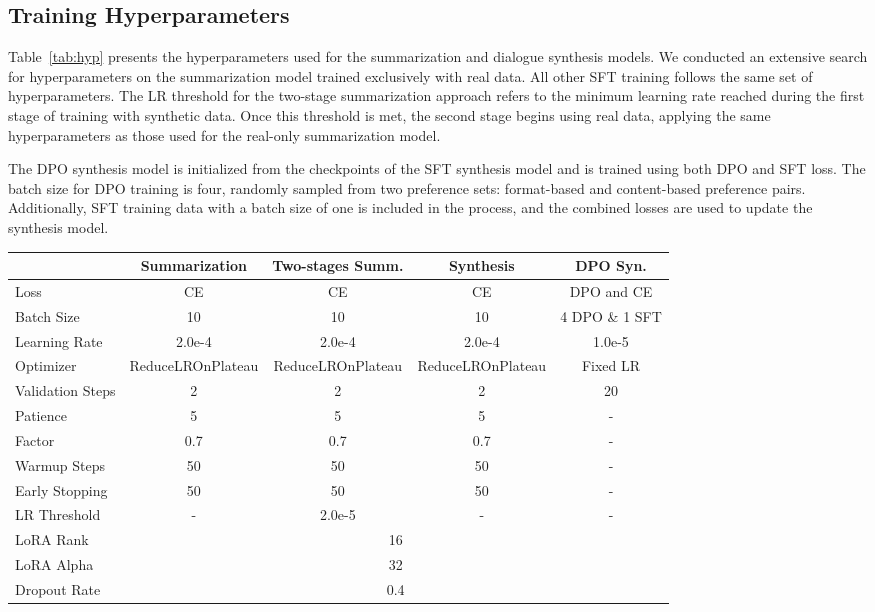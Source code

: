 \subsection{Training Hyperparameters}
Table~\ref{tab:hyp} presents the hyperparameters used for the summarization and dialogue synthesis models. We conducted an extensive search for hyperparameters on the summarization model trained exclusively with real data. All other SFT training follows the same set of hyperparameters. The LR threshold for the two-stage summarization approach refers to the minimum learning rate reached during the first stage of training with synthetic data. Once this threshold is met, the second stage begins using real data, applying the same hyperparameters as those used for the real-only summarization model.

The DPO synthesis model is initialized from the checkpoints of the SFT synthesis model and is trained using both DPO and SFT loss. The batch size for DPO training is four, randomly sampled from two preference sets: format-based and content-based preference pairs. Additionally, SFT training data with a batch size of one is included in the process, and the combined losses are used to update the synthesis model.


\begin{table*}[htbp]
\centering
\caption{Hyper-parameters used for training dialogue summarization, two-stage dialogue summarization, dialogue/summary synthesis, and DPO-based dialogue synthesis models.}
\label{tab:hyp}
\begin{tabular}{@{} lcccc @{}}
\toprule
 & Summarization & Two-stages Summ. & Synthesis & DPO Syn. \\
\midrule
Loss & CE & CE & CE & DPO and CE \\
Batch Size & 10 & 10 & 10 & {\small 4 DPO \& 1 SFT}  \\
Learning Rate & 2.0e-4 & 2.0e-4 & 2.0e-4 & 1.0e-5 \\ 
Optimizer & ReduceLROnPlateau  & ReduceLROnPlateau  & ReduceLROnPlateau & Fixed LR \\ 
Validation Steps & 2 & 2 & 2 & 20 \\
Patience & 5 & 5 & 5 & - \\
Factor & 0.7 & 0.7 & 0.7 & - \\
Warmup Steps &  50 & 50 & 50 & - \\ 
Early Stopping &50 & 50 & 50 & - \\ 
LR Threshold & - & 2.0e-5 & - & - \\\hline
LoRA Rank &  \multicolumn{4}{c}{16} \\  
LoRA Alpha & \multicolumn{4}{c}{32} \\ 
Dropout Rate & \multicolumn{4}{c}{0.4} \\
\bottomrule
\end{tabular}
\end{table*}

